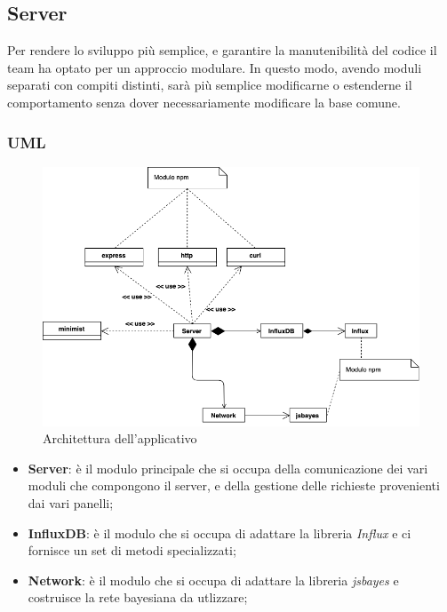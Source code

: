 \subsection{Server}\label{archServer}
Per rendere lo sviluppo più semplice, e garantire la manutenibilità del codice il team ha optato per un approccio modulare. In questo modo, avendo moduli separati con compiti distinti, sarà più semplice modificarne o estenderne il comportamento senza dover necessariamente modificare la base comune.\\

\subsubsection{UML}
\begin{figure}[H]
	\begin{center}
		\includegraphics[scale=0.5]{./images/server_class_non_espanso.png} 
	\end{center}
	\caption{Architettura dell'applicativo}
\end{figure}

\begin{itemize}
 \item \textbf{Server}: è il modulo principale che si occupa della comunicazione dei vari moduli che compongono il server, e della gestione delle richieste provenienti 
 dai vari panelli;
 \item \textbf{InfluxDB}: è il modulo che si occupa di adattare la libreria \textit{Influx} e ci fornisce un set di metodi specializzati;
 \item \textbf{Network}: è il modulo che si occupa di adattare la libreria \textit{jsbayes} e costruisce la rete bayesiana da utlizzare;
\end{itemize}

